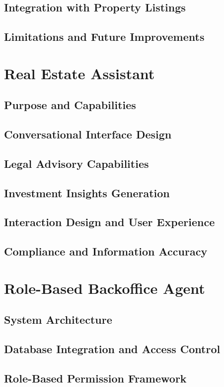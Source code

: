 \subsection{Integration with Property Listings}
\subsection{Limitations and Future Improvements}

\section{Real Estate Assistant}
\subsection{Purpose and Capabilities}
\subsection{Conversational Interface Design}
\subsection{Legal Advisory Capabilities}
\subsection{Investment Insights Generation}
\subsection{Interaction Design and User Experience}
\subsection{Compliance and Information Accuracy}

\section{Role-Based Backoffice Agent}
\subsection{System Architecture}
\subsection{Database Integration and Access Control}
\subsection{Role-Based Permission Framework}
